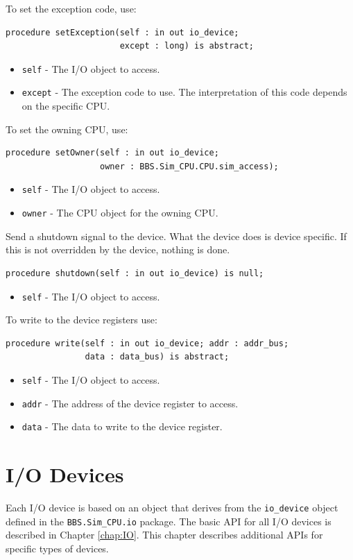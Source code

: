 \documentclass[10pt, openany]{book}
\newcommand{\package}[1]{\texttt{#1}}
\newcommand{\keyword}[1]{\texttt{#1}}
\newcommand{\datatype}[1]{\texttt{#1}}
\begin{document}
To set the exception code, use:
\begin{lstlisting}
procedure setException(self : in out io_device;
                       except : long) is abstract;
\end{lstlisting}
\begin{itemize}
  \item \keyword{self} - The I/O object to access.
  \item \keyword{except} - The exception code to use.  The interpretation of this code depends on the specific CPU.
\end{itemize}

To set the owning CPU, use:
\begin{lstlisting}
procedure setOwner(self : in out io_device;
                   owner : BBS.Sim_CPU.CPU.sim_access);
\end{lstlisting}
\begin{itemize}
  \item \keyword{self} - The I/O object to access.
  \item \keyword{owner} - The CPU object for the owning CPU.
\end{itemize}

Send a shutdown signal to the device.
What the device does is device specific.
If this is not overridden by the device, nothing is done.
\begin{lstlisting}
procedure shutdown(self : in out io_device) is null;
\end{lstlisting}
\begin{itemize}
  \item \keyword{self} - The I/O object to access.
\end{itemize}

To write to the device registers use:
\begin{lstlisting}
procedure write(self : in out io_device; addr : addr_bus;
                data : data_bus) is abstract;
\end{lstlisting}
\begin{itemize}
  \item \keyword{self} - The I/O object to access.
  \item \keyword{addr} - The address of the device register to access.
  \item \keyword{data} - The data to write to the device register.
\end{itemize}

\chapter{I/O Devices}
\label{chap:IODev}
Each I/O device is based on an object that derives from the \datatype{io\_device} object defined in the \package{BBS.Sim\_CPU.io} package.
The basic API for all I/O devices is described in Chapter \ref{chap:IO}.
This chapter describes additional APIs for specific types of devices.
\end{document}
